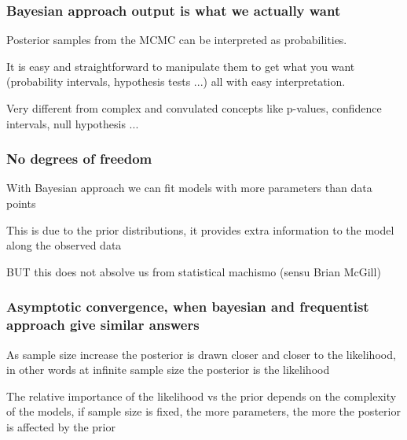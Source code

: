 \documentclass{beamer}
\begin{document}
 
  \begin{frame}
  \frametitle{\bf Bayesian approach output is what we actually want}
  
  Posterior samples from the MCMC can be interpreted as probabilities.\\
  
  \vspace*{0.3cm}
  
  It is easy and straightforward to manipulate them to get what you want (probability intervals, hypothesis tests ...) all with easy interpretation.\\
  
  \vspace*{0.3cm}
  
  Very different from complex and convulated concepts like p-values, confidence intervals, null hypothesis ...
  
  
 \end{frame}
 
  \begin{frame}
  \frametitle{\bf No degrees of freedom}
  
  With Bayesian approach we can fit models with more parameters than data points
  
  \vspace*{0.3cm}
  
  This is due to the prior distributions, it provides extra information to the model along the observed data
  
  \vspace*{0.3cm}
  
  BUT this does not absolve us from statistical machismo (sensu Brian McGill)
  
 \end{frame}
 
  \begin{frame}
  \frametitle{\bf Asymptotic convergence, when bayesian and frequentist approach give similar answers}
  
  As sample size increase the posterior is drawn closer and closer to the likelihood, in other words at infinite sample size the posterior is the likelihood
  
  \vspace*{0.3cm}
  
  The relative importance of the likelihood vs the prior depends on the complexity of the models, if sample size is fixed, the more parameters, the more the posterior is affected by the prior
  
  
 \end{frame}
 
\end{document}
